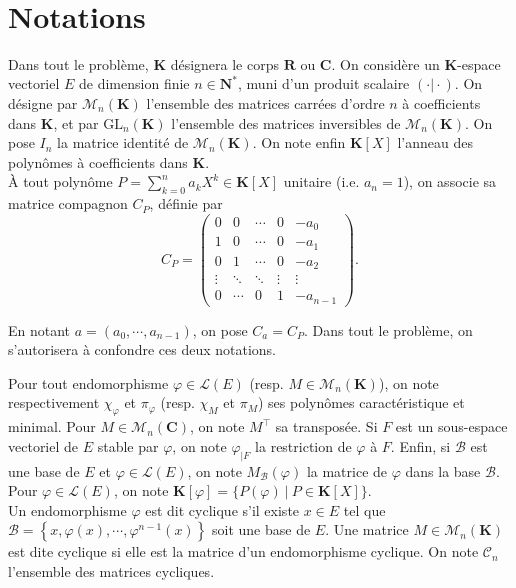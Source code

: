 \documentclass[a4paper,11pt]{article}
\newcommand{\N}{\mathbf{N}}
\newcommand{\R}{\mathbf{R}}
\newcommand{\C}{\mathbf{C}}
\newcommand{\K}{\mathbf{K}}
\newcommand{\M}{\mathcal{M}}
\newcommand{\B}{\mathcal{B}}
\newcommand{\CC}{\mathcal{C}}
\renewcommand{\L}{\mathcal{L}}
\newcommand{\titre}[1]{
		\colorbox{vert1}{
		\parbox{\headwidth}{
			\center{\Large{\sffamily\bfseries{\color{gris}{#1}}}}\\
			\vspace*{1em}
		}}
	}
\begin{document}
\thispagestyle{empty}				%
\pagecolor{gris}						%
\titre{Autour des matrices de Frobenius}		%
\vspace*{1em}

\section*{Notations}
Dans tout le problème, $\K$ désignera le corps $\R$ ou $\C$. On considère un $\K$-espace vectoriel $E$ de dimension finie $n\in\N^*$, muni d'un produit scalaire $(\cdot\vert\cdot)$. On désigne par $\M_n(\K)$ l'ensemble des matrices carrées d'ordre $n$ à coefficients dans $\K$, et par $\mathrm{GL}_n(\K)$ l'ensemble des matrices inversibles de $\M_n(\K)$. On pose $I_n$ la matrice identité de $\M_n(\K)$. On note enfin $\K[X]$ l'anneau des polynômes à coefficients dans $\K$.\\

À tout polynôme $P=\displaystyle\sum_{k=0}^na_kX^k\in\K[X]$ unitaire (i.e. $a_n=1$), on associe sa matrice compagnon $C_P$, définie par
\[C_P=
\begin{pmatrix}
0&0&\cdots&0&-a_0\\
1&0&\cdots&0&-a_1\\
0&1&\cdots&0&-a_2\\
\vdots&\ddots&\ddots&\vdots&\vdots\\
0&\cdots&0&1&-a_{n-1}
\end{pmatrix}.\]

En notant $a=(a_0,\cdots,a_{n-1})$, on pose $C_a=C_P$. Dans tout le problème, on s'autorisera à confondre ces deux notations.

Pour tout endomorphisme $\varphi\in\L(E)$ (resp. $M\in\M_n(\K)$), on note respectivement $\chi_\varphi$ et $\pi_\varphi$ (resp. $\chi_M$ et $\pi_M$) ses polynômes caractéristique et minimal. Pour $M\in\M_n(\C)$, on note $M^\top$ sa transposée. Si $F$ est un sous-espace vectoriel de $E$ stable par $\varphi$, on note $\varphi_{\vert F}$ la restriction de $\varphi$ à $F$. Enfin, si $\B$ est une base de $E$ et $\varphi\in\L(E)$, on note $M_\B(\varphi)$ la matrice de $\varphi$ dans la base $\B$.\\

Pour $\varphi\in\L(E)$, on note $\K[\varphi]=\{P(\varphi)\ \vert\ P\in\K[X]\}$.\\

Un endomorphisme $\varphi$ est dit cyclique s'il existe $x\in E$ tel que $\B=\left\lbrace x,\varphi(x),\cdots,\varphi^{n-1}(x)\right\rbrace$ soit une base de $E$. Une matrice $M\in\M_n(\K)$ est dite cyclique si elle est la matrice d'un endomorphisme cyclique. On note $\CC_n$ l'ensemble des matrices cycliques.\\
\end{document}
